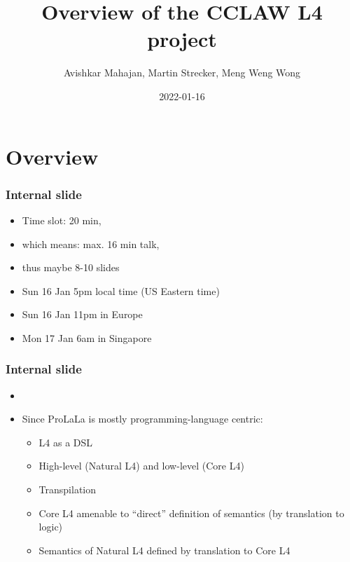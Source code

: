 \documentclass{beamer}
\title{Overview of the CCLAW L4 project}
\author{Avishkar Mahajan, Martin Strecker, Meng Weng Wong}
\date{2022-01-16}
\begin{document}

\begin{frame}
  \titlepage
\end{frame}



\section{Overview}


\begin{frame}[fragile]\frametitle{Internal slide}

  
  \begin{itemize}
  \item Time slot: 20 min, 
  \item which means: max. 16 min talk, 
  \item thus maybe 8-10 slides
  \end{itemize}

  \begin{itemize}
  \item Sun 16 Jan 5pm local time (US Eastern time)
  \item Sun 16 Jan 11pm in Europe
  \item Mon 17 Jan 6am in Singapore
  \end{itemize}

\end{frame}


\begin{frame}[fragile]\frametitle{Internal slide}




  \begin{itemize}
  \item {}
  \item Since ProLaLa is mostly programming-language centric:
    \begin{itemize}
    \item L4 as a DSL
    \item High-level (Natural L4) and low-level (Core L4)
    \item Transpilation
    \item Core L4 amenable to ``direct'' definition of semantics (by translation to logic)
    \item Semantics of Natural L4 defined by translation to Core L4
    \end{itemize}
  \end{itemize}

\end{frame}
\end{document}
